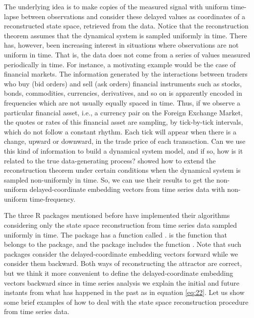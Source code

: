 The underlying idea is to make copies of the measured signal with uniform time-lapse between observations and consider these delayed values as coordinates of a reconstructed state space, retrieved from the data. Notice that the reconstruction theorem assumes that the dynamical system is sampled uniformly in time. There has, however, been increasing interest in situations where observations are not uniform in time. That is, the data does not come from a series of values measured periodically in time. For instance, a motivating example would be the case of financial markets. The information generated by the interactions between traders who buy (bid orders) and sell (ask orders) financial instruments such as stocks, bonds, commodities, currencies, derivatives, and so on is apparently encoded in frequencies which are not usually equally spaced in time. Thus, if we observe a particular financial asset, i.e., a currency pair on the Foreign Exchange Market, the quotes or rates of this financial asset are sampling, by tick-by-tick intervals, which do not follow a constant rhythm. Each tick will appear when there is a change, upward or downward, in the trade price of each transaction. Can we use this kind of information to build a dynamical system model, and if so, how is it related to the true data-generating process? \cite{Huke2007} showed how to extend the reconstruction theorem under certain conditions when the dynamical system is sampled non-uniformly in time. So, we can use their results to get the non-uniform delayed-coordinate embedding vectors from time series data with non-uniform time-frequency.

The three R packages mentioned before have implemented their algorithms considering only the state space reconstruction from time series data sampled uniformly in time. The  package has a function called .  is the function that belongs to the  package, and the  package includes the function . Note that such packages consider the delayed-coordinate embedding vectors forward while we consider them backward. Both ways of reconstructing the attractor are correct, but we think it more convenient to define the delayed-coordinate embedding vectors backward since in time series analysis we explain the initial and future instants from what has happened in the past as in equation \ref{eq:22}. Let us show some brief examples of how to deal with the state space reconstruction procedure from time series data. 

